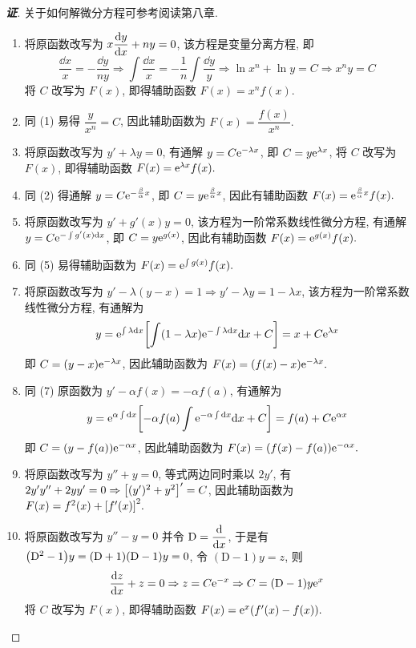 \begin{proof}[{\songti \textbf{证}}]
    关于如何解微分方程可参考阅读第八章.
    \begin{enumerate}[label=(\arabic{*})]
        \item 将原函数改写为 $\displaystyle x\dv{y}{x}+ny=0$, 该方程是变量分离方程, 即
              $$\dfrac{\dd x}{x}=-\dfrac{\dd y}{ny}\Rightarrow \int\dfrac{\dd x}{x}=-\dfrac{1}{n}\int\dfrac{\dd y}{y}\Rightarrow\ln x^n+\ln y=C\Rightarrow x^ny=C$$
              将 $C$ 改写为 $F(x)$, 即得辅助函数 $F(x)=x^nf(x)$.
        \item 同 (1) 易得 $\dfrac{y}{x^n}=C$, 因此辅助函数为 $F(x)=\dfrac{f(x)}{x^n}.$
        \item 将原函数改写为 $y'+\lambda y=0$, 有通解 $y=C\mathrm{e}^{-\lambda x}$, 即 $C=y\mathrm{e}^{\lambda x}$, 将 $C$ 改写为 $F(x)$, 即得辅助函数 $F(x)=\mathrm{e}^{\lambda x}f(x).$
        \item 同 (2) 得通解 $y=C\mathrm{e}^{-\frac{\beta}{\alpha}x}$, 即 $C=y\mathrm{e}^{\frac{\beta}{\alpha}x}$, 因此有辅助函数 $F(x)=\mathrm{e}^{\frac{\beta}{\alpha}x}f(x).$
        \item 将原函数改写为 $y'+g'(x)y=0$, 该方程为一阶常系数线性微分方程, 有通解 $y=C\mathrm{e}^{-\int g'(x)\dd x}$, 即 $C=y\mathrm{e}^{g(x)}$, 因此有辅助函数 $F(x)=\mathrm{e}^{g(x)}f(x).$
        \item 同 (5) 易得辅助函数为 $F(x)=\mathrm{e}^{\int g(x)}f(x).$
        \item 将原函数改写为 $y'-\lambda(y-x)=1\Rightarrow y'-\lambda y=1-\lambda x$, 该方程为一阶常系数线性微分方程, 有通解为
              $$y=\mathrm{e}^{\int\lambda\dd x}\qty[\int(1-\lambda x)\mathrm{e}^{-\int\lambda\dd  x}\dd x+C]=x+C\mathrm{e}^{\lambda x}$$
              即 $C=(y-x)\mathrm{e}^{-\lambda x}$, 因此辅助函数为 $F(x)=(f(x)-x)\mathrm{e}^{-\lambda x}.$
        \item 同 (7) 原函数为 $y'-\alpha f(x)=-\alpha f(a)$, 有通解为
              $$y=\mathrm{e}^{\alpha\int\dd x}\qty[-\alpha f(a)\int\mathrm{e}^{-\alpha \int\dd x}\dd x+C]=f(a)+C\mathrm{e}^{\alpha x}$$
              即 $C=(y-f(a))\mathrm{e}^{-\alpha x}$, 因此辅助函数为 $F(x)=(f(x)-f(a))\mathrm{e}^{-\alpha x}.$
        \item 将原函数改写为 $y''+y=0$, 等式两边同时乘以 $2y'$, 有 $2y'y''+2yy'=0\Rightarrow \qty[(y')^2+y^2]'=C$, 因此辅助函数为 $F(x)=f^2(x)+\qty[f'(x)]^2.$
        \item 将原函数改写为 $y''-y=0$ 并令 $\displaystyle \mathrm{D}=\dv{x}$, 于是有 $\qty(\mathrm{D}^2-1)y=(\mathrm{D}+1)(\mathrm{D}-1)y=0$, 令 $(\mathrm{D}-1)y=z$, 则
              $$\dv{z}{x}+z=0\Rightarrow z=C\mathrm{e}^{-x}\Rightarrow C=(\mathrm{D}-1)y\mathrm{e}^{x}$$
              将 $C$ 改写为 $F(x)$, 即得辅助函数 $F(x)=\mathrm{e}^{x}(f'(x)-f(x)).$
    \end{enumerate}
\end{proof}

